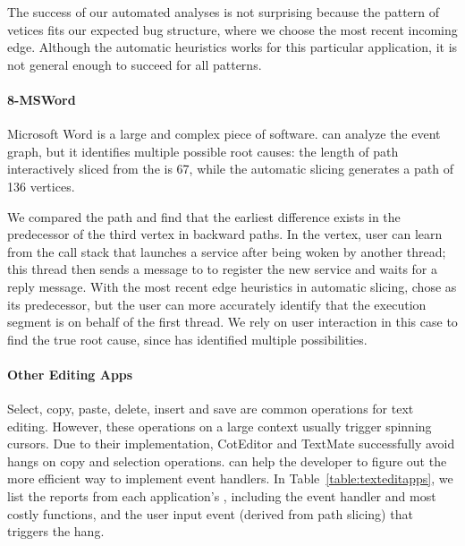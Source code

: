 The success of our automated analyses is not surprising because the pattern of
vetices fits our expected bug structure, where we choose the most recent
incoming edge.  Although the automatic heuristics works for this particular
application, it is not general enough to succeed for all patterns.

\paragraph{8-MSWord}

Microsoft Word is a large and complex piece of software. \xxx can analyze the
event graph, but it identifies multiple possible root causes: the length of
path interactively sliced from the \spinningnode is 67, while the automatic
slicing generates a path of 136 vertices.


We compared the path and find that the earliest difference exists in the
predecessor of the third vertex in backward paths. In the vertex, user can
learn from the call stack that  launches a service
 after being woken by another
 thread; this thread then sends a message to  to
register the new service and waits for a reply message. With the most recent
edge heuristics in automatic slicing, \xxx chose  as its
predecessor, but the user can more accurately identify that the execution
segment is on behalf of the first thread. We rely on user interaction in this
case to find the true root cause, since \xxx has identified multiple
possibilities.

\paragraph{Other Editing Apps}

Select, copy, paste, delete, insert and save are common operations for text
editing. However, these operations on a large context usually trigger spinning
cursors. Due to their implementation, CotEditor and TextMate successfully avoid
hangs on copy and selection operations. \xxx can help the developer to figure
out the more efficient way to implement event handlers. In
Table~\ref{table:texteditapps}, we list the reports from each application's
\spinningnode, including the event handler and most costly functions, and the
user input event (derived from path slicing) that triggers the hang.

